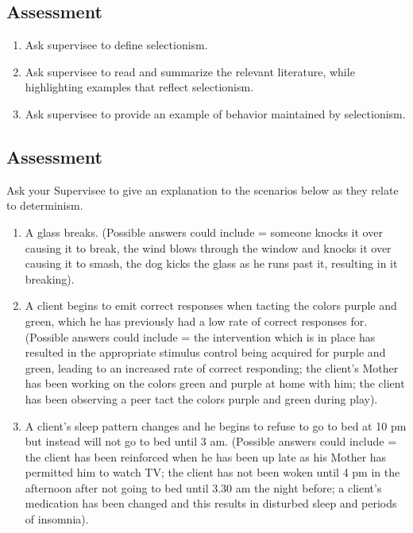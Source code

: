 \subsection{Assessment}
\begin{enumerate}
\item Ask supervisee to define selectionism.
\item Ask supervisee to read and summarize the relevant literature, while highlighting examples that reflect selectionism.
\item Ask supervisee to provide an example of behavior maintained by selectionism.
%
\end{enumerate}
%
\subsection{Assessment}
Ask your Supervisee to give an explanation to the scenarios below as they relate to determinism.
\begin{enumerate}
\item A glass breaks. (Possible answers could include = someone knocks it over causing it to break, the wind blows through the window and knocks it over causing it to smash, the dog kicks the glass as he runs past it, resulting in it breaking).
\item A client begins to emit correct responses when tacting the colors purple and green, which he has previously had a low rate of correct responses for. (Possible answers could include = the intervention which is in place has resulted in the appropriate stimulus control being acquired for purple and green, leading to an increased rate of correct responding; the client's Mother has been working on the colors green and purple at home with him; the client has been observing a peer tact the colors purple and green during play).
\item A client's sleep pattern changes and he begins to refuse to go to bed at 10 pm but instead will not go to bed until 3 am. (Possible answers could include = the client has been reinforced when he has been up late as his Mother has permitted him to watch TV; the client has not been woken until 4 pm in the afternoon after not going to bed until 3.30 am the night before; a client's medication has been changed and this results in disturbed sleep and periods of insomnia). 
\end{enumerate}
%
